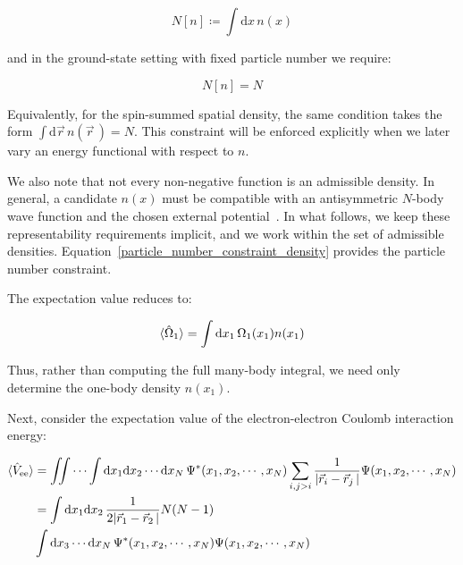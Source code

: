 \begin{equation}
    N[n]\coloneqq\int\mathrm{d}x\,n(x)
\label{particle_number_functional}
\end{equation}

and in the ground-state setting with fixed particle number we require:

\begin{equation}
    N[n]=N
\label{particle_number_constraint_density}
\end{equation}

Equivalently, for the spin-summed spatial density, the same condition takes the form $\int \mathrm{d}\vec{r}\,n(\vec{r}\,)=N$.
This constraint will be enforced explicitly when we later vary an energy functional with respect to $n$.

We also note that not every non-negative function is an admissible density.
In general, a candidate $n(x)$ must be compatible with an antisymmetric $N$-body wave function and the chosen external potential~\cite{lieb1983density}.
In what follows, we keep these representability requirements implicit,
and we work within the set of admissible densities.
Equation~\eqref{particle_number_constraint_density} provides the particle number constraint.


The expectation value reduces to:

\begin{equation}
    \braket{\hat\Omega_1}=\int\mathrm{d}x_1\,\Omega_1(x_1)n(x_1)
\label{observables_one-body_density}
\end{equation}

Thus, rather than computing the full many-body integral, we need only determine the one-body density $n(x_1)$.

Next, consider the expectation value of the electron-electron Coulomb interaction energy:

\begin{equation}
\begin{aligned}
    \braket{\hat{V}_\mathrm{ee}}
    &= \iint\cdots\int \mathrm{d}x_1\mathrm{d}x_2\cdots\mathrm{d}x_N\,\Psi^*(x_1,x_2,\cdots,x_N)\sum_{i,j>i}\frac{1}{|\vec{r}_i-\vec{r}_j\,|}\Psi(x_1,x_2,\cdots,x_N) \\
    &= \int\mathrm{d}x_1\mathrm{d}x_2\,\frac{1}{2|\vec{r}_1-\vec{r}_2\,|}N(N-1) \\ &\int\mathrm{d}x_3\cdots\mathrm{d}x_N\,\Psi^*(x_1,x_2,\cdots,x_N)\Psi(x_1,x_2,\cdots,x_N)
\end{aligned}
\label{coulomb_interaction_energy}
\end{equation}

